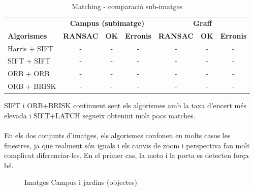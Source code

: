 		\begin{table}[H]
			\begin{center}
				\begin{tabular}{l | c c c | c c c}
					& \multicolumn{3}{c|}{\textbf{Campus (subimatge)}} & \multicolumn{3}{c}{\textbf{Graff}} \\
					\textbf{Algorismes} & \textbf{RANSAC} & \textbf{OK} & \textbf{Erronis} & \textbf{RANSAC} & \textbf{OK} & \textbf{Erronis} \\ \hline
					Harris + SIFT & - & - & - & - & - & - \\
					SIFT + SIFT & - & - & - & - & - & - \\
					ORB + ORB & - & - & - & - & - & - \\
					ORB + BRISK & - & - & - & - & - & - \\
				\end{tabular}
			\end{center}
			\caption{Matching - comparació sub-imatges}
		\end{table}
		\noindent
		SIFT i ORB+BRISK continuent sent els algorismes amb la taxa d'encert més elevada i SIFT+LATCH segueix obtenint molt pocs matches.\\\\
		En els dos conjunts d'imatges, els algorismes confonen en molts casos
		les finestres, ja que realment són iguals i els canvis de zoom i perspectiva fan molt complicat diferenciar-les. En el primer cas, la moto i la porta es detecten força bé.

		\begin{figure}[!htb]
			\caption{Imatges Campus i jardins (objectes)}
		\end{figure}


